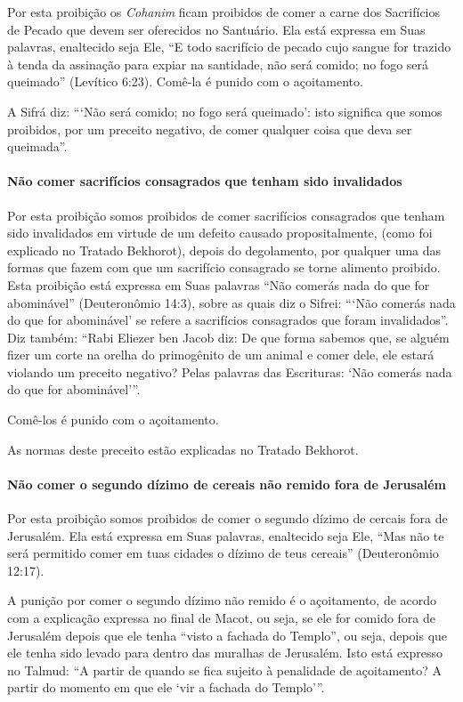 Por esta proibição os \textit{Cohanim} ficam proibidos de comer a carne dos
Sacrifícios de Pecado que devem ser oferecidos no Santuário. Ela está
expressa em Suas palavras, enaltecido seja Ele, ``E todo sacrifício de
pecado cujo sangue for trazido à tenda da assinação para expiar na
santidade, não será comido; no fogo será queimado'' (Levítico 6:23).
Comê-la é punido com o açoitamento.

A Sifrá diz: ```Não será comido; no fogo será queimado': isto significa
que somos proibidos, por um preceito negativo, de comer qualquer coisa
que deva ser queimada''.

\paragraph{Não comer sacrifícios consagrados que tenham sido invalidados}

Por esta proibição somos proibidos de comer sacrifícios consagrados que
tenham sido invalidados em virtude de um defeito causado
propositalmente, (como foi explicado no Tratado Bekhorot), depois do
degolamento, por qualquer uma das formas que fazem com que um sacrifício consagrado se
torne alimento proibido. Esta proibição está expressa em Suas palavras
``Não comerás nada do que for abominável'' (Deuteronômio 14:3), sobre
as quais diz o Sifrei: ```Não comerás nada do que for abominável' se
refere a sacrifícios consagrados que foram invalidados''. Diz também:
``Rabi Eliezer ben Jacob diz: De que forma sabemos que, se alguém fizer
um corte na orelha do primogênito de um animal e comer dele, ele estará
violando um preceito negativo? Pelas palavras das Escrituras: `Não
comerás nada do que for abominável'''.

Comê-los é punido com o açoitamento.

As normas deste preceito estão explicadas no Tratado Bekhorot.

\paragraph{Não comer o segundo dízimo de cereais não remido fora de Jerusalém}

Por esta proibição somos proibidos de comer o segundo dízimo de cercais
fora de Jerusalém. Ela está expressa em Suas palavras, enaltecido seja
Ele, ``Mas não te será permitido comer em tuas cidades o dízimo de teus
cereais'' (Deuteronômio 12:17).

A punição por comer o segundo dízimo não remido é o açoitamento, de
acordo com a explicação expressa no final de Macot, ou seja, se ele for
comido fora de Jerusalém depois que ele tenha ``visto a fachada do
Templo'', ou seja, depois que ele tenha sido levado para dentro das
muralhas de Jerusalém. Isto está expresso no Talmud: ``A partir de
quando se fica sujeito à penalidade de açoitamento? A partir do momento
em que ele `vir a fachada do Templo'''.

